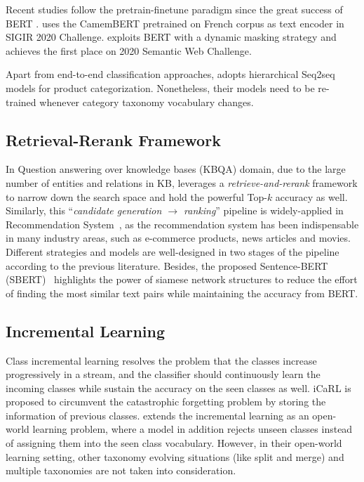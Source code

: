 Recent studies follow the pretrain-finetune paradigm since the great success of BERT \cite{devlin-etal-2019-bert}. 
\cite{lee2020cbb} uses the CamemBERT pretrained on French corpus as text encoder in SIGIR 2020 
Challenge. \cite{yang2020bert} exploits BERT with a dynamic masking strategy and achieves the first place on 
2020 Semantic Web Challenge.

Apart from end-to-end classification approaches, \cite{hasson2021category, li2018don} adopts  hierarchical 
Seq2seq
models for product categorization. Nonetheless, their models need to be re-trained whenever category taxonomy vocabulary changes.
\subsection{Retrieval-Rerank Framework}
In Question answering over knowledge bases (KBQA) domain, due to the large number of entities and relations in KB, \cite{wang-etal-2021-retrieval} leverages a \textit{retrieve-and-rerank} framework to narrow down the search space and hold the powerful Top-$k$ accuracy as well. Similarly, this ``\textit{candidate generation $\rightarrow$ ranking}'' pipeline is widely-applied in Recommendation System~\cite{liu2017related}, as the recommendation system has been indispensable in many industry areas, such as e-commerce products, news articles and movies. Different strategies and models are well-designed in two stages of the pipeline according to the previous literature. Besides, the proposed Sentence-BERT (SBERT)~\cite{reimers2019sentence} highlights the power of siamese network structures to reduce the effort of finding the most similar text pairs while maintaining the accuracy from BERT. 
\subsection{Incremental Learning}
Class incremental learning resolves the problem that the classes increase progressively in a stream, and the classifier should continuously learn the incoming classes while sustain the accuracy on the seen classes as well. iCaRL \cite{rebuffi2017icarl} is proposed to 
circumvent the catastrophic forgetting problem by storing the information of previous classes. 
\cite{xu2019open} extends the incremental learning as an open-world learning problem, where a model in addition rejects unseen classes instead of assigning them into the seen class vocabulary. 
However, in their open-world learning setting, other taxonomy evolving situations (like split and merge) and multiple taxonomies are not taken into consideration.